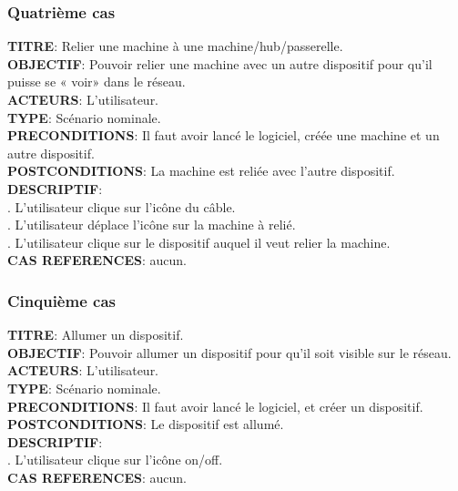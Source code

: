\subsubsection{Quatrième cas}
\noindent\textbf{TITRE}: Relier une machine à une machine/hub/passerelle.\\
\textbf{OBJECTIF}: Pouvoir relier une machine avec un autre dispositif pour qu’il puisse se « voir» dans le réseau.\\
\textbf{ACTEURS}: L’utilisateur.\\
\textbf{TYPE}: Scénario nominale.\\
\textbf{PRECONDITIONS}: Il faut avoir lancé le logiciel, créée une machine et un autre dispositif.\\
\textbf{POSTCONDITIONS}: La machine est reliée avec l’autre dispositif.\\
\textbf{DESCRIPTIF}: \\
. L’utilisateur clique sur l’icône du câble.\\
. L’utilisateur déplace l’icône sur la machine à relié.\\
. L’utilisateur clique sur le dispositif auquel il veut relier la machine.\\
\textbf{CAS REFERENCES}: aucun.\\

\subsubsection{Cinquième cas}
\noindent\textbf{TITRE}: Allumer un dispositif.\\
\textbf{OBJECTIF}: Pouvoir allumer un dispositif pour qu’il soit visible sur le réseau.\\
\textbf{ACTEURS}: L’utilisateur.\\
\textbf{TYPE}: Scénario nominale.\\
\textbf{PRECONDITIONS}: Il faut avoir lancé le logiciel, et créer un dispositif.\\
\textbf{POSTCONDITIONS}: Le dispositif est allumé.\\
\textbf{DESCRIPTIF}:\\
. L’utilisateur clique sur l’icône on/off.\\
\textbf{CAS REFERENCES}: aucun.\\
